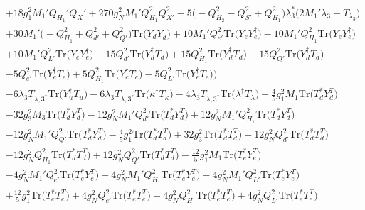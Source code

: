 {\begin{align}
 &+18 g_{1}^{2} M_1' Q_{H_1}' Q_X' +270 g_{N}^{2} M_1' Q_{H_1}^{2} Q_{X'}^{2} -5 \Big(- Q_{H_2}^{2}  - Q_{S'}^{2}  + Q_{H_1}^{2}\Big)\lambda_3^* \Big(2 M_1' \lambda_3  - T_{\lambda_3} \Big)\nonumber \\ 
 &+30 M_1' \Big(- Q_{H_1}^{2}  + Q_{d'}^{2} + Q_{Q'}^{2}\Big)\mbox{Tr}\Big({Y_d  Y_{d}^{\dagger}}\Big) +10 M_1' Q_{e'}^{2} \mbox{Tr}\Big({Y_e  Y_{e}^{\dagger}}\Big) -10 M_1' Q_{H_1}^{2} \mbox{Tr}\Big({Y_e  Y_{e}^{\dagger}}\Big) \nonumber \\ 
 &+10 M_1' Q_{L'}^{2} \mbox{Tr}\Big({Y_e  Y_{e}^{\dagger}}\Big) -15 Q_{d'}^{2} \mbox{Tr}\Big({Y_{d}^{\dagger}  T_d}\Big) +15 Q_{H_1}^{2} \mbox{Tr}\Big({Y_{d}^{\dagger}  T_d}\Big) -15 Q_{Q'}^{2} \mbox{Tr}\Big({Y_{d}^{\dagger}  T_d}\Big) \nonumber \\ 
 &-5 Q_{e'}^{2} \mbox{Tr}\Big({Y_{e}^{\dagger}  T_e}\Big) +5 Q_{H_1}^{2} \mbox{Tr}\Big({Y_{e}^{\dagger}  T_e}\Big) -5 Q_{L'}^{2} \mbox{Tr}\Big({Y_{e}^{\dagger}  T_e}\Big) \Big)\nonumber \\ 
 &-6 \lambda_3 T_{{\lambda,3}^*} \mbox{Tr}\Big({Y_{u}^{\dagger}  T_u}\Big) -6 \lambda_3 T_{{\lambda,3}^*} \mbox{Tr}\Big({\kappa^{\dagger}  T_{\kappa}}\Big) -4 \lambda_3 T_{{\lambda,3}^*} \mbox{Tr}\Big({\lambda^{\dagger}  T_{\lambda}}\Big) +\frac{4}{5} g_{1}^{2} M_1 \mbox{Tr}\Big({T_d^*  Y_{d}^{T}}\Big) \nonumber \\ 
 &-32 g_{3}^{2} M_3 \mbox{Tr}\Big({T_d^*  Y_{d}^{T}}\Big) -12 g_{N}^{2} M_1' Q_{d'}^{2} \mbox{Tr}\Big({T_d^*  Y_{d}^{T}}\Big) +12 g_{N}^{2} M_1' Q_{H_1}^{2} \mbox{Tr}\Big({T_d^*  Y_{d}^{T}}\Big) \nonumber \\ 
 &-12 g_{N}^{2} M_1' Q_{Q'}^{2} \mbox{Tr}\Big({T_d^*  Y_{d}^{T}}\Big) -\frac{4}{5} g_{1}^{2} \mbox{Tr}\Big({T_d^*  T_{d}^{T}}\Big) +32 g_{3}^{2} \mbox{Tr}\Big({T_d^*  T_{d}^{T}}\Big) +12 g_{N}^{2} Q_{d'}^{2} \mbox{Tr}\Big({T_d^*  T_{d}^{T}}\Big) \nonumber \\ 
 &-12 g_{N}^{2} Q_{H_1}^{2} \mbox{Tr}\Big({T_d^*  T_{d}^{T}}\Big) +12 g_{N}^{2} Q_{Q'}^{2} \mbox{Tr}\Big({T_d^*  T_{d}^{T}}\Big) -\frac{12}{5} g_{1}^{2} M_1 \mbox{Tr}\Big({T_e^*  Y_{e}^{T}}\Big) \nonumber \\ 
 &-4 g_{N}^{2} M_1' Q_{e'}^{2} \mbox{Tr}\Big({T_e^*  Y_{e}^{T}}\Big) +4 g_{N}^{2} M_1' Q_{H_1}^{2} \mbox{Tr}\Big({T_e^*  Y_{e}^{T}}\Big) -4 g_{N}^{2} M_1' Q_{L'}^{2} \mbox{Tr}\Big({T_e^*  Y_{e}^{T}}\Big) \nonumber \\ 
 &+\frac{12}{5} g_{1}^{2} \mbox{Tr}\Big({T_e^*  T_{e}^{T}}\Big) +4 g_{N}^{2} Q_{e'}^{2} \mbox{Tr}\Big({T_e^*  T_{e}^{T}}\Big) -4 g_{N}^{2} Q_{H_1}^{2} \mbox{Tr}\Big({T_e^*  T_{e}^{T}}\Big) +4 g_{N}^{2} Q_{L'}^{2} \mbox{Tr}\Big({T_e^*  T_{e}^{T}}\Big) \nonumber \\ 

\end{align}}
